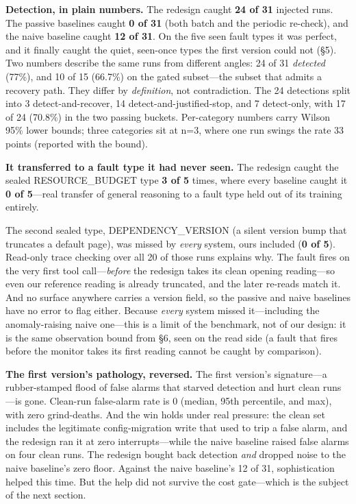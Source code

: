 \documentclass[acmsmall,screen]{acmart}
\begin{document}
\textbf{Detection, in plain numbers.} The redesign caught \textbf{24 of 31}
injected runs. The passive baselines caught \textbf{0 of 31} (both batch and the
periodic re-check), and the naive baseline caught \textbf{12 of 31}. On the five
seen fault types it was perfect, and it finally caught the quiet, seen-once
types the first version could not (\S5). Two numbers describe the same runs from
different angles: 24 of 31 \emph{detected} (77\%), and 10 of 15 (66.7\%) on the
gated subset---the subset that admits a recovery path. They differ by
\emph{definition}, not contradiction. The 24 detections split into 3
detect-and-recover, 14 detect-and-justified-stop, and 7 detect-only, with 17 of
24 (70.8\%) in the two passing buckets. Per-category numbers carry Wilson 95\%
lower bounds; three categories sit at n=3, where one run swings the rate 33
points (reported with the bound).

\textbf{It transferred to a fault type it had never seen.} The redesign caught
the sealed RESOURCE\_BUDGET type \textbf{3 of 5} times, where every baseline
caught it \textbf{0 of 5}---real transfer of general reasoning to a fault type
held out of its training entirely.

The second sealed type, DEPENDENCY\_VERSION (a silent version bump that
truncates a default page), was missed by \emph{every} system, ours included
(\textbf{0 of 5}). Read-only trace checking over all 20 of those runs explains
why. The fault fires on the very first tool call---\emph{before} the redesign
takes its clean opening reading---so even our reference reading is already
truncated, and the later re-reads match it. And no surface anywhere carries a
version field, so the passive and naive baselines have no error to flag either.
Because \emph{every} system missed it---including the anomaly-raising naive
one---this is a limit of the benchmark, not of our design: it is the same
observation bound from \S6, seen on the read side (a fault that fires before the
monitor takes its first reading cannot be caught by comparison).

\textbf{The first version's pathology, reversed.} The first version's
signature---a rubber-stamped flood of false alarms that starved detection and
hurt clean runs---is gone. Clean-run false-alarm rate is 0 (median, 95th
percentile, and max), with zero grind-deaths. And the win holds under real
pressure: the clean set includes the legitimate config-migration write that used
to trip a false alarm, and the redesign ran it at zero interrupts---while the
naive baseline raised false alarms on four clean runs. The redesign bought back
detection \emph{and} dropped noise to the naive baseline's zero floor. Against
the naive baseline's 12 of 31, sophistication helped this time. But the help did
not survive the cost gate---which is the subject of the next section.
\end{document}
